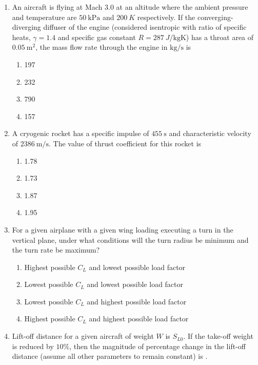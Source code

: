 \documentclass[journal]{IEEEtran}
\begin{document}
\begin{enumerate}
\hfill{}

\item
An aircraft is flying at Mach $3.0$ at an altitude where the ambient pressure and temperature are $50 \ \text{kPa}$ and $200 \ K$ respectively. If the converging-diverging diffuser of the engine (considered isentropic with ratio of specific heats, $\gamma = 1.4$ and specific gas constant $R = 287 \ J/\text{kgK}$) has a throat area of $0.05 \ \text{m}^2$, the mass flow rate through the engine in $\text{kg/s}$ is  
\begin{enumerate}
    \item 197
    \item 232
    \item 790
    \item 157
\end{enumerate} 
\hfill{}

\item 
A cryogenic rocket has a specific impulse of $455 \ \text{s}$ and characteristic velocity of $2386 \ \text{m/s}$. The value of thrust coefficient for this rocket is  
\begin{enumerate}
    \item 1.78
    \item 1.73
    \item 1.87
    \item 1.95
\end{enumerate} 
\hfill{}

\item 
For a given airplane with a given wing loading executing a turn in the vertical plane, under what conditions will the turn radius be minimum and the turn rate be maximum?  
\begin{enumerate}
    \item Highest possible $C_L$ and lowest possible load factor  
    \item Lowest possible $C_L$ and lowest possible load factor  
    \item Lowest possible $C_L$ and highest possible load factor  
    \item Highest possible $C_L$ and highest possible load factor
\end{enumerate}
\hfill{}

\item  
Lift-off distance for a given aircraft of weight $W$ is $S_{L0}$. If the take-off weight is reduced by $10\%$, then the magnitude of percentage change in the lift-off distance (assume all other parameters to remain constant) is \underline{\hspace{1.5cm}}. 
\hfill{}


\end{enumerate}
\end{document}

